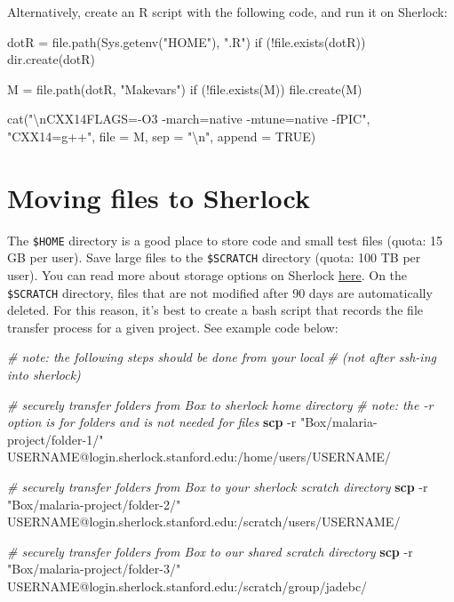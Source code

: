 \documentclass[
]{book}
\newenvironment{Shaded}{\begin{snugshade}}{\end{snugshade}}
\newcommand{\AttributeTok}[1]{\textcolor[rgb]{0.13,0.29,0.53}{#1}}
\newcommand{\CommentTok}[1]{\textcolor[rgb]{0.56,0.35,0.01}{\textit{#1}}}
\newcommand{\FunctionTok}[1]{\textcolor[rgb]{0.13,0.29,0.53}{\textbf{#1}}}
\newcommand{\NormalTok}[1]{#1}
\newcommand{\StringTok}[1]{\textcolor[rgb]{0.31,0.60,0.02}{#1}}
\begin{document}
Alternatively, create an R script with the following code, and run it on Sherlock:

\begin{Shaded}
\begin{Highlighting}[]
\NormalTok{dotR = file.path(Sys.getenv("HOME"), ".R")}
\NormalTok{if (!file.exists(dotR)) dir.create(dotR)}

\NormalTok{M = file.path(dotR, "Makevars")}
\NormalTok{if (!file.exists(M)) file.create(M)}

\NormalTok{cat("\textbackslash{}nCXX14FLAGS={-}O3 {-}march=native {-}mtune=native {-}fPIC",}
\NormalTok{    "CXX14=g++",}
\NormalTok{    file = M, sep = "\textbackslash{}n", append = TRUE)}
\end{Highlighting}
\end{Shaded}

\section{Moving files to Sherlock}\label{moving-files-to-sherlock}

The \texttt{\$HOME} directory is a good place to store code and small test files (quota: 15 GB per user). Save large files to the \texttt{\$SCRATCH} directory (quota: 100 TB per user). You can read more about storage options on Sherlock \href{https://www.sherlock.stanford.edu/docs/storage/}{here}. On the \texttt{\$SCRATCH} directory, files that are not modified after 90 days are automatically deleted. For this reason, it's best to create a bash script that records the file transfer process for a given project. See example code below:

\begin{Shaded}
\begin{Highlighting}[]
\CommentTok{\# note: the following steps should be done from your local }
\CommentTok{\# (not after ssh{-}ing into sherlock)}

\CommentTok{\# securely transfer folders from Box to sherlock home directory}
\CommentTok{\# note: the {-}r option is for folders and is not needed for files}
\FunctionTok{scp} \AttributeTok{{-}r} \StringTok{"Box/malaria{-}project/folder{-}1/"}\NormalTok{ USERNAME@login.sherlock.stanford.edu:/home/users/USERNAME/}

\CommentTok{\# securely transfer folders from Box to your sherlock scratch directory}
\FunctionTok{scp} \AttributeTok{{-}r} \StringTok{"Box/malaria{-}project/folder{-}2/"}\NormalTok{ USERNAME@login.sherlock.stanford.edu:/scratch/users/USERNAME/}

\CommentTok{\# securely transfer folders from Box to our shared scratch directory}
\FunctionTok{scp} \AttributeTok{{-}r} \StringTok{"Box/malaria{-}project/folder{-}3/"}\NormalTok{ USERNAME@login.sherlock.stanford.edu:/scratch/group/jadebc/}
\end{Highlighting}
\end{Shaded}
\end{document}
